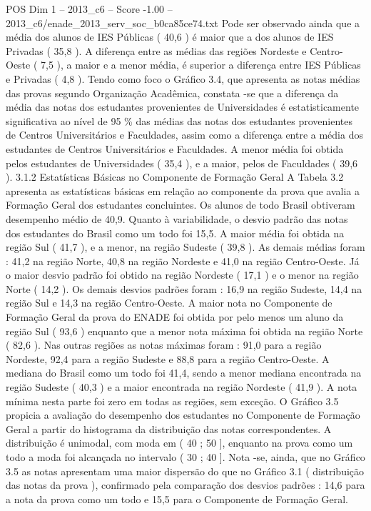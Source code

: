 \begin{textsample}{POS Dim 1 – 2013\_c6 – Score -1.00 – 2013\_c6/enade\_2013\_serv\_soc\_b0ca85ce74.txt}
Pode ser observado ainda que a média dos alunos de IES Públicas ( 40,6 ) é maior que a dos alunos de IES Privadas ( 35,8 ).
A diferença entre as médias das regiões Nordeste e Centro-Oeste ( 7,5 ), a maior e a menor média, é superior a diferença entre IES Públicas e Privadas ( 4,8 ).
Tendo como foco o Gráfico 3.4, que apresenta as notas médias das provas segundo Organização Acadêmica, constata -se que a diferença da média das notas dos estudantes provenientes de Universidades é estatisticamente significativa ao nível de 95 \% das médias das notas dos estudantes provenientes de Centros Universitários e Faculdades, assim como a diferença entre a média dos estudantes de Centros Universitários e Faculdades.
A menor média foi obtida pelos estudantes de Universidades ( 35,4 ), e a maior, pelos de Faculdades ( 39,6 ). 3.1.2 Estatísticas Básicas no Componente de Formação Geral A Tabela 3.2 apresenta as estatísticas básicas em relação ao componente da prova que avalia a Formação Geral dos estudantes concluintes.
Os alunos de todo Brasil obtiveram desempenho médio de 40,9.
Quanto à variabilidade, o desvio padrão das notas dos estudantes do Brasil como um todo foi 15,5.
A maior média foi obtida na região Sul ( 41,7 ), e a menor, na região Sudeste ( 39,8 ).
As demais médias foram : 41,2 na região Norte, 40,8 na região Nordeste e 41,0 na região Centro-Oeste.
Já o maior desvio padrão foi obtido na região Nordeste ( 17,1 ) e o menor na região Norte ( 14,2 ).
Os demais desvios padrões foram : 16,9 na região Sudeste, 14,4 na região Sul e 14,3 na região Centro-Oeste.
A maior nota no Componente de Formação Geral da prova do ENADE foi obtida por pelo menos um aluno da região Sul ( 93,6 ) enquanto que a menor nota máxima foi obtida na região Norte ( 82,6 ).
Nas outras regiões as notas máximas foram : 91,0 para a região Nordeste, 92,4 para a região Sudeste e 88,8 para a região Centro-Oeste.
A mediana do Brasil como um todo foi 41,4, sendo a menor mediana encontrada na região Sudeste ( 40,3 ) e a maior encontrada na região Nordeste ( 41,9 ).
A nota mínima nesta parte foi zero em todas as regiões, sem exceção.
O Gráfico 3.5 propicia a avaliação do desempenho dos estudantes no Componente de Formação Geral a partir do histograma da distribuição das notas correspondentes.
A distribuição é unimodal, com moda em ( 40 ; 50 ], enquanto na prova como um todo a moda foi alcançada no intervalo ( 30 ; 40 ].
Nota -se, ainda, que no Gráfico 3.5 as notas apresentam uma maior dispersão do que no Gráfico 3.1 ( distribuição das notas da prova ), confirmado pela comparação dos desvios padrões : 14,6 para a nota da prova como um todo e 15,5 para o Componente de Formação Geral.

\end{textsample}
